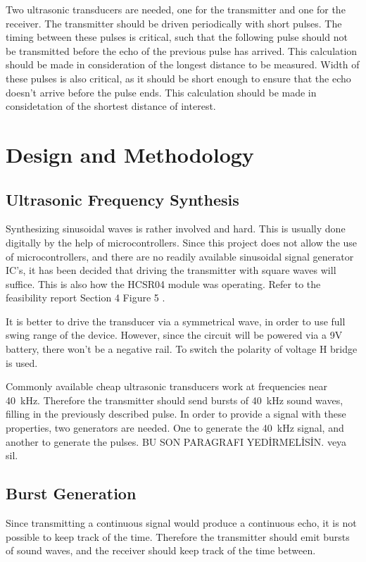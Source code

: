 \documentclass[12pt, a4paper]{article}
\begin{document}
        \bigskip 
        Two ultrasonic transducers are needed, one for the transmitter and one for the receiver. The transmitter should be driven periodically with short pulses. The timing between these pulses is critical, such that the following pulse should not be transmitted before the echo of the previous pulse has arrived. This calculation should be made in consideration of the longest distance to be measured. Width of these pulses is also critical, as it should be short enough to ensure that the echo doesn't arrive before the pulse ends. This calculation should be made in considetation of the shortest distance of interest. 
    

    \pagebreak    
    \section{Design and Methodology}
    	\subsection{Ultrasonic Frequency Synthesis}
	
	Synthesizing sinusoidal waves is rather involved and hard. This is usually done digitally by the help of microcontrollers. Since this project does not allow the use of microcontrollers, and there are no readily available sinusoidal signal generator IC’s, it has been decided that driving the transmitter with square waves will suffice. This is also how the HCSR04 module was operating. Refer to the feasibility report Section 4 Figure 5 .
	
	\bigskip
	It is better to drive the transducer via a symmetrical wave, in order to use full swing range of the device. However, since the circuit will be powered via a 9V battery, there won’t be a negative rail. To switch the polarity of voltage H bridge is used. 
	
	 \bigskip
    Commonly available cheap ultrasonic transducers work at frequencies near \SI{40}{\kilo\hertz}. Therefore the transmitter should send bursts of \SI{40}{\kilo\hertz} sound waves, filling in the previously described pulse. In order to provide a signal with these properties, two generators are needed. One to generate the \SI{40}{\kilo\hertz} signal, and another to generate the pulses.  BU SON PARAGRAFI YEDİRMELİSİN. veya sil.
	\subsection{Burst Generation}
	Since transmitting a continuous signal would produce a continuous echo, it is not possible to keep track of the time. Therefore the transmitter should emit bursts of sound waves, and the receiver should keep track of the time between.
 	
\end{document}
